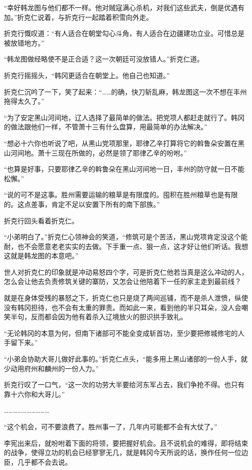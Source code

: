 “幸好韩龙图与他们都不一样。他对贼寇满心杀机，对我们这些武夫，倒是优遇有加。”折克仁说着，与折克行一起踏着积雪向外走。

折克行慨叹道：“有人适合在朝堂勾心斗角，有人适合在边疆建功立业。可惜总是被放错地方。”

“韩龙图做经略使不是正合适？这一次朝廷可没放错人。”折克仁道。

折克行摇摇头，“韩冈更适合在朝堂上。他自己也知道。”

折克仁沉吟了一下，笑了起来：“……的确，快刀斩乱麻，韩龙图这一次不想在丰州拖得太久了。”

“为了安定黑山河间地，辽人选择了最简单的做法。把党项人都赶走就行了。韩冈的做法跟他们一样，不管萧十三有什么盘算，用最简单的办法解决。”

“想必十六你也听说了吧，从黑山党项那里，耶律乙辛打算将它的斡鲁朵安置在黑山河间地。萧十三现在所做的，必然是领了耶律乙辛的吩咐。”

“也算是好事，只要耶律乙辛的斡鲁朵在黑山河间地一日，丰州的防守就一日不能松懈。”

“说的可不是这事。胜州需要运输的粮草是有限度的。囤积在胜州粮草也是有限的。这点差事，肯定不足以安置下所有的南下部族。”

折克行回头看着折克仁。

“小弟明白了。”折克仁心领神会的笑道，“修筑可是个苦活，黑山党项肯定没这个能耐，也不会愿意老老实实的去做。下手重一点、狠一点，这才好让他们听话。我想这就是韩龙图的本意吧。”

世人对折克仁的印象就是冲动易怒四个字，可是折克仁他若当真是这么冲动的人，怎么会让他去负责修筑关键的寨防，又怎会让他陪着下一任的家主走到最前线？

就是在身体受残的暴怒之下，折克仁也只是烧了两间巡铺，而不是杀人泄愤，纵使没有韩冈担待，也不会有太重的罪责。而如此一来，看到他的半只耳朵，没人会嘲笑半句，反而都会因为他有着杀入辽境放火的胆识拱手致礼。

“无论韩冈的本意为何，但南下诸部可不能全变成斩首功，至少要把修城修宅的人手留下来。”

“小弟会协助大哥儿做好此事的。”折克仁点头，“能多用上黑山诸部的一份人手，就少动用府州和麟州的一份人力。”

折克行叹了一口气，“这一次的功劳大半要给河东军占去，我们争抢不得。也只有靠十六你和大哥儿。”

…………………………

“这个机会，可不要浪费了。胜州事一了，几年内可能都不会有大仗了。”

李宪出来后，就吩咐着下面的将领，要把握好机会。且不说机会的难得，即将结束的战争，使得立功的机会已经寥寥无几，就是韩冈今天所说的话，换作任何一位边臣，几乎都不会去说。


